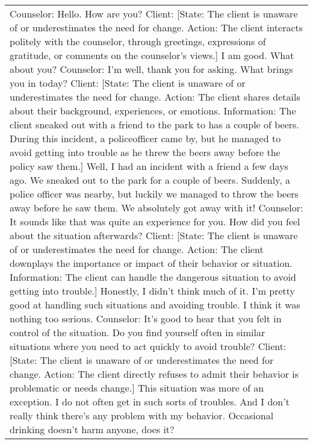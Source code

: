 \begin{table*}[tb]
\begin{tabularx}{\textwidth}{X}
\toprule
Counselor: Hello. How are you?  \newline
Client: {\color{blue} [State: The client is unaware of or underestimates the need for change. Action: The client interacts politely with the counselor, through greetings, expressions of gratitude, or comments on the counselor's views.] }I am good. What about you? \newline
Counselor: I'm well, thank you for asking. What brings you in today? \newline
Client: {\color{blue} [State: The client is unaware of or underestimates the need for change. Action: The client shares details about their background, experiences, or emotions. Information: The client sneaked out with a friend to the park to has a couple of beers. During this incident, a policeofficer came by, but he managed to avoid getting into trouble as he threw the beers away before the policy saw them.] }Well, I had an incident with a friend a few days ago. We sneaked out to the park for a couple of beers. Suddenly, a police officer was nearby, but luckily we managed to throw the beers away before he saw them. We absolutely got away with it! \newline
Counselor: It sounds like that was quite an experience for you. How did you feel about the situation afterwards?  \newline
Client: {\color{blue} [State: The client is unaware of or underestimates the need for change. Action: The client downplays the importance or impact of their behavior or situation. Information: The client can handle the dangerous situation to avoid getting into trouble.]} Honestly, I didn't think much of it. I'm pretty good at handling such situations and avoiding trouble. I think it was nothing too serious. \newline
Counselor: It's good to hear that you felt in control of the situation. Do you find yourself often in similar situations where you need to act quickly to avoid trouble?  \newline
Client: {\color{blue} [State: The client is unaware of or underestimates the need for change. Action: The client directly refuses to admit their behavior is problematic or needs change.]} This situation was more of an exception. I do not often get in such sorts of troubles. And I don't really think there's any problem with my behavior. Occasional drinking doesn't harm anyone, does it? \newline

\end{tabularx}
\end{table*}
